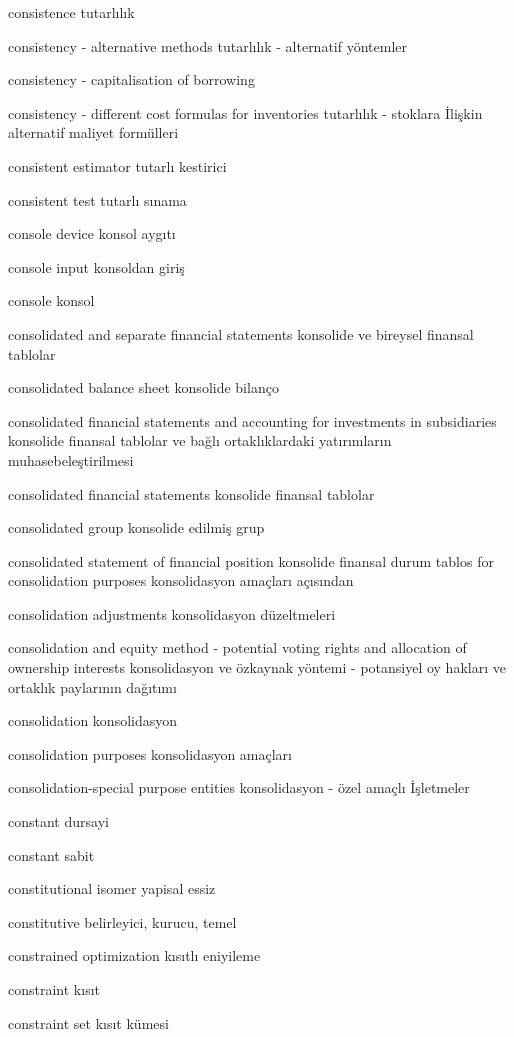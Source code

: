 \documentclass[12pt,fleqn]{article}\usepackage{../../common}
\begin{document}
consistence tutarlılık

consistency - alternative methods tutarlılık - alternatif yöntemler

consistency - capitalisation of borrowing

consistency - different cost formulas for inventories tutarlılık - stoklara İlişkin alternatif maliyet formülleri

consistent estimator tutarlı kestirici

consistent test tutarlı sınama

console device konsol aygıtı

console input konsoldan giriş

console konsol

consolidated and separate financial statements konsolide ve bireysel finansal tablolar

consolidated balance sheet konsolide bilanço

consolidated financial statements and accounting for investments in subsidiaries konsolide finansal tablolar ve bağlı ortaklıklardaki yatırımların muhasebeleştirilmesi

consolidated financial statements konsolide finansal tablolar

consolidated group konsolide edilmiş grup

consolidated statement of financial position konsolide finansal durum tablos for consolidation purposes konsolidasyon amaçları açısından

consolidation adjustments konsolidasyon düzeltmeleri

consolidation and equity method - potential voting rights and allocation of ownership interests konsolidasyon ve özkaynak yöntemi - potansiyel oy hakları ve ortaklık paylarının dağıtımı

consolidation konsolidasyon

consolidation purposes konsolidasyon amaçları

consolidation-special purpose entities konsolidasyon - özel amaçlı İşletmeler

constant dursayi

constant sabit

constitutional isomer yapisal essiz

constitutive belirleyici, kurucu, temel

constrained optimization kısıtlı eniyileme

constraint kısıt

constraint set kısıt kümesi
\end{document}
